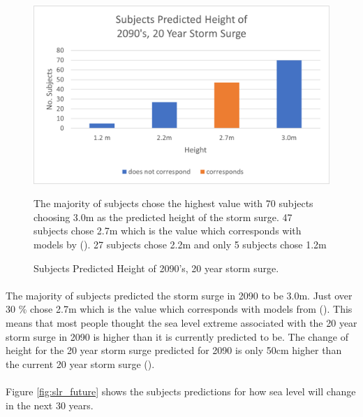 \begin{figure}[H]
    \centering
    \includegraphics{fig_results/2090s 20yr ss answers.png}
    \caption{Subjects Predicted Height of 2090's, 20 year storm surge.}{ The majority of subjects chose the highest value with 70 subjects choosing 3.0m as the predicted height of the storm surge. 47 subjects chose 2.7m which is the value which corresponds with models by (\cite{kartverket_se_2021}). 27 subjects chose 2.2m and only 5 subjects chose 1.2m}
    \label{fig:2090-stormsurge-answers}
\end{figure}
\paragraph{}
The majority of subjects predicted the storm surge in 2090 to be 3.0m. Just over 30 \% chose 2.7m which is the value which corresponds with models from (\cite{kartverket_se_2021}). This means that most people thought the sea level extreme associated with the 20 year storm surge in 2090 is higher than it is currently predicted to be. The change of height for the 20 year storm surge predicted for 2090 is only 50cm higher than the current 20 year storm surge (\cite{kartverket_se_2021}). 
\paragraph{}
Figure \ref{fig:slr_future} shows the subjects predictions for how sea level will change in the next 30 years. 

